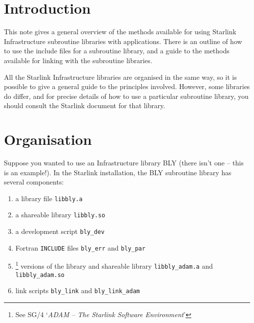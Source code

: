 \documentclass[twoside,11pt,nolof]{starlink}
\begin{document}
\scfrontmatter


\section{Introduction}
\label{introduction}

This note gives a general overview of the methods available for using
Starlink Infrastructure subroutine libraries with applications.
There is an outline of how to use the include files for a subroutine
library, and a guide to the methods available for linking with the
subroutine libraries.

All the Starlink Infrastructure libraries are organised in the same way,
so it is possible to give a general guide to the principles involved.
However, some libraries do differ, and for precise details of how to use a
particular subroutine library, you should consult the Starlink document
for that library.

\section{Organisation}
\label{organisation}

Suppose you wanted to use an Infrastructure library BLY (there isn't one
-- this is an example!).  In the Starlink installation, the BLY subroutine
library has several components:

\begin{enumerate}

\item a library file \texttt{libbly.a}

\item a shareable library \texttt{libbly.so}

\item a development script \texttt{bly\_dev}

\item Fortran \texttt{INCLUDE} files \texttt{bly\_err} and \texttt{bly\_par}

\item {}\footnote{See SG/4 `\emph{ADAM -- The Starlink Software
Environment}'} versions of the library and shareable library
\texttt{libbly\_adam.a} and \texttt{libbly\_adam.so}

\item link scripts \texttt{bly\_link} and \texttt{bly\_link\_adam}

\end{enumerate}
\end{document}
